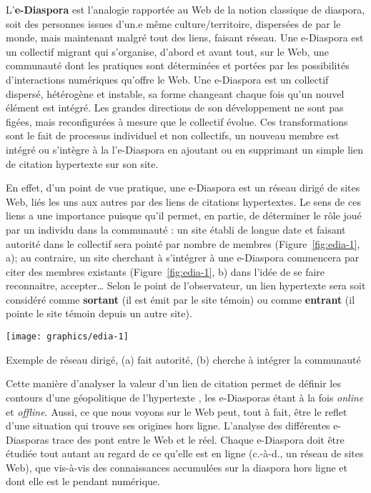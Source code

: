 \documentclass[symmetric,justified,marginals=raggedouter]{tufte-book}
\begin{document}
L'\textbf{e-Diaspora} est l'analogie rapportée au Web de la notion classique de diaspora, soit des personnes issues d'un.e même culture/territoire, dispersées de par le monde, mais maintenant malgré tout des liens, faisant réseau. Une e-Diaspora est un collectif migrant qui s'organise, d'abord et avant tout, sur le Web, une communauté dont les pratiques sont déterminées et portées par les possibilités d'interactions numériques qu'offre le Web. Une e-Diaspora est un collectif dispersé, hétérogène et instable, sa forme changeant chaque fois qu'un nouvel élément est intégré. Les grandes directions de son développement ne sont pas figées, mais reconfigurées à mesure que le collectif évolue. Ces transformations sont le fait de processus individuel et non collectifs, un nouveau membre est intégré ou s'intègre à la l'e-Diaspora en ajoutant ou en supprimant un simple lien de citation hypertexte sur son site. 

En effet, d'un point de vue pratique, une e-Diaspora est un réseau dirigé de sites Web, liés les uns aux autres par des liens de citations hypertextes. Le sens de ces liens a une importance puisque qu'il permet, en partie, de déterminer le rôle joué par un individu dans la communauté : un site établi de longue date et faisant autorité dans le collectif sera pointé par nombre de membres (Figure~\ref{fig:edia-1}, a); au contraire, un site cherchant à s'intégrer à une e-Diaspora commencera par citer des membres existants (Figure~\ref{fig:edia-1}, b) dans l'idée de se faire reconnaitre, accepter\ldots{} Selon le point de l'observateur, un lien hypertexte sera soit considéré comme \textbf{sortant} (il est émit par le site témoin) ou comme \textbf{entrant} (il pointe le site témoin depuis un autre site). 

\begin{marginfigure}%
  \texttt{[image: graphics/edia-1]}
  \vspace*{0.2cm}  
  \caption{Exemple de réseau dirigé, (a) fait autorité, (b) cherche à intégrer la communauté}
  \label{fig:edia-1}
\end{marginfigure}  

Cette manière d'analyser la valeur d'un lien de citation permet de définir les contours d'une géopolitique de l'hypertexte \citep{rogers_national_2013}, les e-Diasporas étant à la fois \textit{online} et \textit{offline}. Aussi, ce que nous voyons sur le Web peut, tout à fait, être le reflet d'une situation qui trouve ses origines hors ligne. L'analyse des différentes e-Diasporas trace des pont entre le Web et le réel. Chaque e-Diaspora doit être étudiée tout autant au regard de ce qu'elle est en ligne (c.-à-d., un réseau de sites Web), que vis-à-vis des connaissances accumulées sur la diaspora hors ligne et dont elle est le pendant numérique.    
\end{document}
